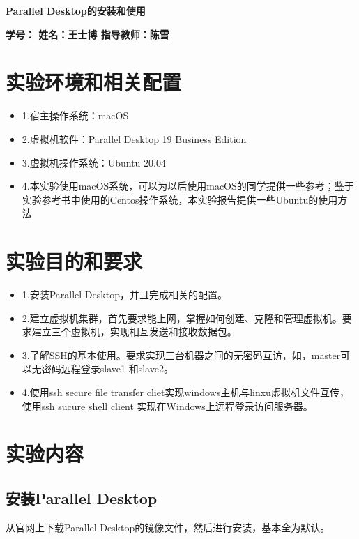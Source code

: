 \documentclass{article}
\begin{document}
 \pingfang
\begin{center}
\textbf{\huge Parallel Desktop的安装和使用}
\end{center}
\begin{center}
    \textbf{\large \textbf{学号： \quad 姓名：王士博 \quad 指导教师：陈雪}}
\end{center}
\hrulefill
\section{实验环境和相关配置}
\begin{itemize}
    \item 1.宿主操作系统：macOS
    \item 2.虚拟机软件：Parallel Desktop 19 Business Edition
    \item 3.虚拟机操作系统：Ubuntu 20.04
    \item 4.本实验使用macOS系统，可以为以后使用macOS的同学提供一些参考；鉴于实验参考书中使用的Centos操作系统，本实验报告提供一些Ubuntu的使用方法
\end{itemize}
\section{实验目的和要求}
\begin{itemize}
    \item 1.安装Parallel Desktop，并且完成相关的配置。
    \item 2.建立虚拟机集群，首先要求能上网，掌握如何创建、克隆和管理虚拟机。要求建立三个虚拟机，实现相互发送和接收数据包。
    \item 3.了解SSH的基本使用。要求实现三台机器之间的无密码互访，如，master可以无密码远程登录slave1 和slave2。
    \item 4.使用ssh secure file transfer cliet实现windows主机与linxu虚拟机文件互传，使用ssh sucure shell client 实现在Windows上远程登录访问服务器。
\end{itemize}
\section{实验内容}
\subsection{安装Parallel Desktop}
\indent 从官网上下载Parallel Desktop的镜像文件，然后进行安装，基本全为默认。
\end{document}
